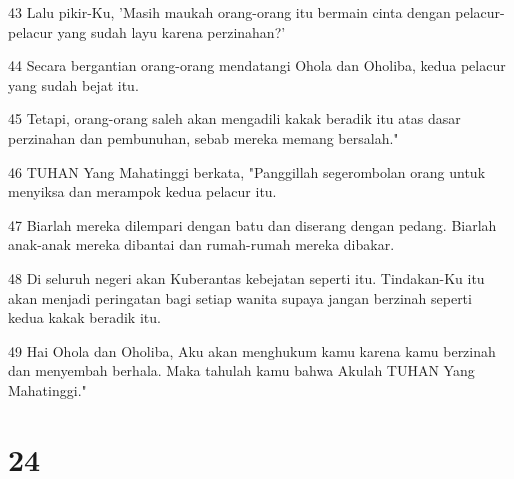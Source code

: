 \par 43 Lalu pikir-Ku, 'Masih maukah orang-orang itu bermain cinta dengan pelacur-pelacur yang sudah layu karena perzinahan?'
\par 44 Secara bergantian orang-orang mendatangi Ohola dan Oholiba, kedua pelacur yang sudah bejat itu.
\par 45 Tetapi, orang-orang saleh akan mengadili kakak beradik itu atas dasar perzinahan dan pembunuhan, sebab mereka memang bersalah."
\par 46 TUHAN Yang Mahatinggi berkata, "Panggillah segerombolan orang untuk menyiksa dan merampok kedua pelacur itu.
\par 47 Biarlah mereka dilempari dengan batu dan diserang dengan pedang. Biarlah anak-anak mereka dibantai dan rumah-rumah mereka dibakar.
\par 48 Di seluruh negeri akan Kuberantas kebejatan seperti itu. Tindakan-Ku itu akan menjadi peringatan bagi setiap wanita supaya jangan berzinah seperti kedua kakak beradik itu.
\par 49 Hai Ohola dan Oholiba, Aku akan menghukum kamu karena kamu berzinah dan menyembah berhala. Maka tahulah kamu bahwa Akulah TUHAN Yang Mahatinggi."

\chapter{24}

